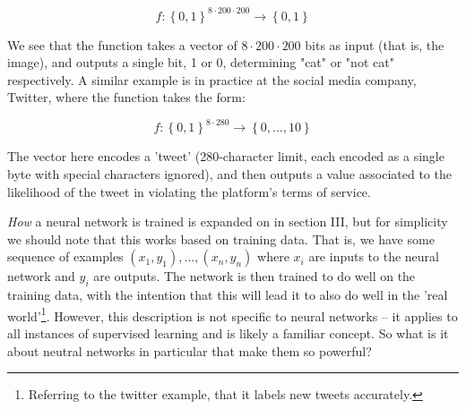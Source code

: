 \documentclass[11pt]{article}
\begin{document}
\begin{equation}f: \left \{ 0,1 \right \}^{8\cdot 200 \cdot 200} \rightarrow  \left \{ 0,1 \right \} \nonumber\end{equation}

We see that the function takes a vector of $8\cdot 200 \cdot 200$ bits as input (that is, the image), and outputs a single bit, 1 or 0, determining "cat" or "not cat" respectively. A similar example is in practice at the social media company, Twitter, where the function takes the form:

\begin{equation}f: \left \{ 0,1 \right \}^{8\cdot 280} \rightarrow  \left \{ 0,...,10 \right \} \nonumber\end{equation}

The vector here encodes a 'tweet' (280-character limit, each encoded as a single byte with special characters ignored), and then outputs a value associated to the likelihood of the tweet in violating the platform's terms of service.

\textit{How} a neural network is trained is expanded on in section III, but for simplicity we should note that this works based on training data. That is, we have some sequence of examples $(x_{1},y_{1}),...,(x_{n},y_{n})$ where $x_{i}$ are inputs to the neural network and $y_{i}$ are outputs. The network is then trained to do well on the training data, with the intention that this will lead it to also do well in the 'real world'\footnote{Referring to the twitter example, that it labels new tweets accurately.}. However, this description is not specific to neural networks – it applies to all instances of supervised learning and is likely a familiar concept. So what is it about neutral networks in particular that make them so powerful?
\end{document}
